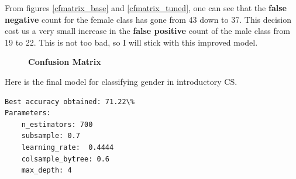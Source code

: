 From figures \ref{cfmatrix_base} and \ref{cfmatrix_tuned}, one can see that the \textbf{false negative} count for the female class has gone from 43 down to 37. This decision cost us a very small increase in the \textbf{false positive} count of the male class from 19 to 22. This is not too bad, so I will stick with this improved model.

\begin{figure}[!hbtp]
\centering

    \caption{\textbf{Confusion Matrix}}
\end{figure}

Here is the final model for classifying gender in introductory CS. 
\begin{verbatim}
Best accuracy obtained: 71.22\%
Parameters:
    n_estimators: 700
    subsample: 0.7
    learning_rate:  0.4444
    colsample_bytree: 0.6
    max_depth: 4

\end{verbatim}


